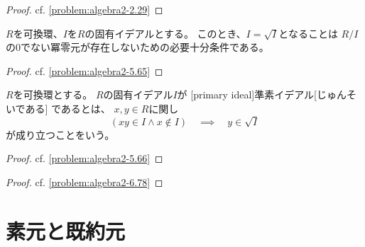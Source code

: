 \documentclass[report]{jlreq}
\begin{document}
\begin{proof}
    cf. \cref{problem:algebra2-2.29}
\end{proof}

\begin{proposition}[根基の特徴付け]
    $R$を可換環、$I$を$R$の固有イデアルとする。
    このとき、$I = \sqrt{I}$となることは
    $R / I$の$0$でない冪零元が存在しないための必要十分条件である。
\end{proposition}

\begin{proof}
    cf. \cref{problem:algebra2-5.65}
\end{proof}

\begin{definition}[準素イデアル]
    $R$を可換環とする。
    $R$の固有イデアル$I$が
    [primary ideal]{準素イデアル}[じゅんそいである]
    であるとは、
    $x, y \in R$に関し
    \begin{equation}
        (xy \in I \land x \not\in I)
        \quad \implies \quad
        y \in \sqrt{I}
    \end{equation}
    が成り立つことをいう。
\end{definition}


\begin{proof}
    cf. \cref{problem:algebra2-5.66}
\end{proof}


\begin{proof}
    cf. \cref{problem:algebra2-6.78}
\end{proof}


%
\section{素元と既約元}
\end{document}
